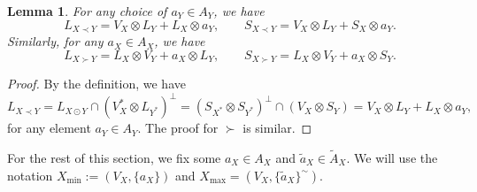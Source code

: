 \documentclass[12pt]{article}
\newtheorem{lemma}{Lemma}
\theoremstyle{definition}
\theoremstyle{remark}
\begin{document}
\begin{lemma}\label{lemma:prec} For any choice of $a_Y\in A_Y$, we have
\[
L_{X\prec Y}=V_X\otimes L_Y+L_X\otimes a_Y,\qquad S_{X\prec Y} =V_X\otimes L_Y+S_X\otimes
a_Y.
\]
Similarly, for any $a_X\in A_X$, we have
\[
L_{X\succ Y}=L_X\otimes V_Y+a_X\otimes L_Y,\qquad S_{X\succ Y} =L_X\otimes V_Y+a_X\otimes
S_Y.
\]
\end{lemma}

\begin{proof} By the definition, we have
\[
L_{X\prec Y}= L_{X\odot Y}\cap (V_X^*\otimes L_{Y^*})^\perp=(S_{X^*}\otimes
S_{Y^*})^\perp\cap (V_X\otimes S_Y)=V_X\otimes L_Y+L_X\otimes a_Y,
\]
for any element $a_Y\in A_Y$.
The proof for $\succ$ is similar.

\end{proof}




For the rest of this section, we fix some  $a_X\in A_X$ and $\tilde a_X\in \tilde A_X$. We will use the notation
$X_{\min}:=(V_X,\{a_X\})$ and 
$X_{\max}=(V_X, \{\tilde a_X\}^\sim)$. 
\end{document}
